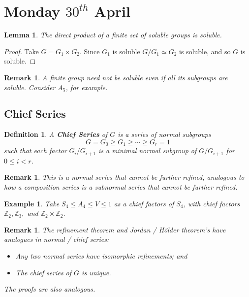\documentclass[a4paper,10pt]{article}
\newcommand{\ZZ}{\mathbb{Z}}
\newtheorem{Def}[thm]{Definition}
\newtheorem{eg}[thm]{Example}
\newtheorem{Lem}[thm]{Lemma}
\newtheorem{rem}[thm]{Remark}
\begin{document}
\newpage
\section{Monday $30^{th}$ April}

\begin{Lem}
The direct product of a finite set of soluble groups is soluble. 
\end{Lem}

\begin{proof}
Take $G = G_1 \times G_2$. Since $G_1$ is soluble $G / G_1 \simeq G_2$ is soluble, and so $G$ is soluble. 
\end{proof}

\begin{rem}
A finite group need not be soluble even if all its subgroups are soluble. Consider $A_5$, for example.
\end{rem}


\subsection{Chief Series}
\begin{Def}
A \textbf{Chief Series} of $G$ is a series of normal subgroups
\[ G = G_0 \geq G_1 \geq \cdots \geq G_r = 1 \]
such that each factor $G_{i} / G_{i+1}$ is a minimal normal subgroup of $G / G_{i + 1}$ for $0 \leq i < r$. 
\end{Def}

\begin{rem}
This is a normal series that cannot be further refined, analogous to how a composition series is a subnormal series that cannot be further refined. 
\end{rem}

\begin{eg}
Take $S_4 \leq A_4 \leq V \leq 1$ as a chief factors of $S_4$, with chief factors $\ZZ_2, \ZZ_3,$ and $\ZZ_2 \times \ZZ_2$. 
\end{eg}

\begin{rem}
The refinement theorem and Jordan / H\"{o}lder theorem's have analogues in normal / chief series:
\begin{itemize}
\item  Any two normal series have isomorphic refinements; and
\item The chief series of $G$ is unique. 
\end{itemize}
The proofs are also analogous. 
\end{rem}
\end{document}
